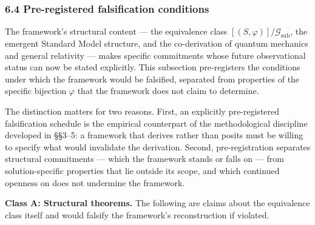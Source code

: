 \documentclass[
]{article}
\begin{document}
\hypertarget{pre-registered-falsification-conditions}{%
\subsubsection{6.4 Pre-registered falsification
conditions}\label{pre-registered-falsification-conditions}}

The framework's structural content --- the equivalence class
\([(S, \varphi)]/\mathcal{G}_{\text{sub}}\), the emergent Standard Model
structure, and the co-derivation of quantum mechanics and general
relativity --- makes specific commitments whose future observational
status can now be stated explicitly. This subsection pre-registers the
conditions under which the framework would be falsified, separated from
properties of the specific bijection \(\varphi\) that the framework does
not claim to determine.

The distinction matters for two reasons. First, an explicitly
pre-registered falsification schedule is the empirical counterpart of
the methodological discipline developed in §§3--5: a framework that
derives rather than posits must be willing to specify what would
invalidate the derivation. Second, pre-registration separates structural
commitments --- which the framework stands or falls on --- from
solution-specific properties that lie outside its scope, and which
continued openness on does not undermine the framework.

\textbf{Class A: Structural theorems.} The following are claims about
the equivalence class itself and would falsify the framework's
reconstruction if violated.
\end{document}
